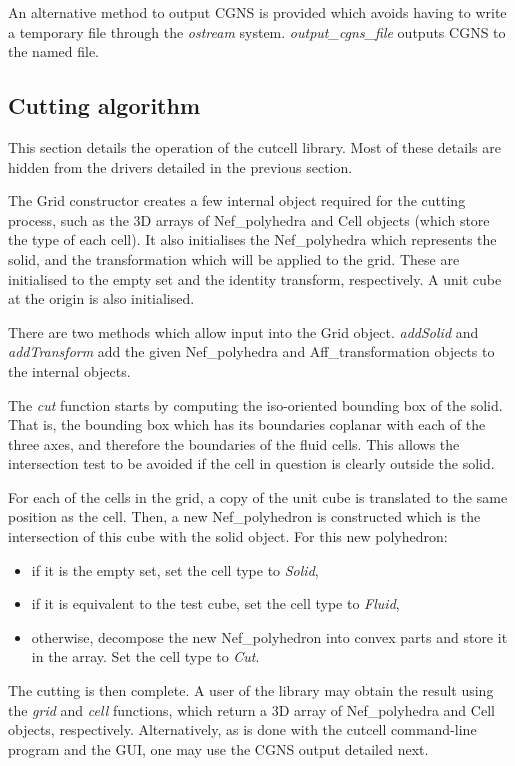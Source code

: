 \documentclass[a4paper,10pt]{article}
\begin{document}
An alternative method to output CGNS is provided which avoids having to write a
temporary file through the \textit{ostream} system. \textit{output\_cgns\_file}
outputs CGNS to the named file.

\subsection{Cutting algorithm}

This section details the operation of the cutcell library. Most of these
details are hidden from the drivers detailed in the previous section.

The Grid constructor creates a few internal object required for the cutting
process, such as the 3D arrays of Nef\_polyhedra and Cell objects (which store
the type of each cell). It also initialises the Nef\_polyhedra which represents
the solid, and the transformation which will be applied to the grid. These are
initialised to the empty set and the identity transform, respectively. A unit
cube at the origin is also initialised.

There are two methods which allow input into the Grid object. \textit{addSolid}
and \textit{addTransform} add the given Nef\_polyhedra and Aff\_transformation
objects to the internal objects.

The \textit{cut} function starts by computing the iso-oriented bounding box of
the solid. That is, the bounding box which has its boundaries coplanar with
each of the three axes, and therefore the boundaries of the fluid cells. This
allows the intersection test to be avoided if the cell in question is clearly
outside the solid.

For each of the cells in the grid, a copy of the unit cube is translated to the
same position as the cell. Then, a new Nef\_polyhedron is constructed which is
the intersection of this cube with the solid object. For this new polyhedron:
\begin{itemize}
 \item if it is the empty set, set the cell type to \textit{Solid},
 \item if it is equivalent to the test cube, set the cell type to
\textit{Fluid},
 \item otherwise, decompose the new Nef\_polyhedron into convex parts and store
it in the array. Set the cell type to \textit{Cut}.
\end{itemize}

The cutting is then complete. A user of the library may obtain the result using
the \textit{grid} and \textit{cell} functions, which return a 3D array of
Nef\_polyhedra and Cell objects, respectively. Alternatively, as is done with
the cutcell command-line program and the GUI, one may use the CGNS output
detailed next.
\end{document}
